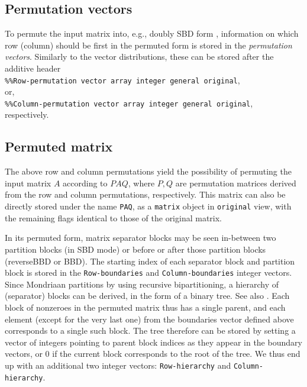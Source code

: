 \documentclass[final]{amsart}
\begin{document}
\subsection{Permutation vectors}

To permute the input matrix into, e.g., doubly SBD form \cite{co1,co2},
information on which row (column) should be first in the permuted form is stored in the \emph{permutation vectors}.
Similarly to the vector distributions,
these can be stored after the additive header\\
\verb|%%Row-permutation vector array integer general original|,\\
or,\\
\verb|%%Column-permutation vector array integer general original|,\\
respectively.


\subsection{Permuted matrix}
The above row and column permutations yield the possibility of permuting the
input matrix $A$ according to $PAQ$, where $P,Q$ are permutation matrices
derived from the row and column permutations, respectively.
This matrix can also be directly stored under the name \verb|PAQ|,
as a \verb|matrix| object in \verb|original| view, with the remaining flags
identical to those of the original matrix.

In its permuted form,
matrix separator blocks may be seen in-between two partition blocks 
(in SBD mode)
or before or after those partition blocks
(reverseBBD or BBD).
The starting index of each separator block and partition block is stored in the
\verb|Row-boundaries| and \verb|Column-boundaries| integer vectors.
Since Mondriaan partitions by using recursive bipartitioning,
a hierarchy of (separator) blocks can be derived,
in the form of a binary tree. See also \cite{co2}.
Each block of nonzeroes in the permuted matrix
thus has a single parent, and each element (except for the very last one)
from the boundaries vector defined above corresponds to a single such block.
The tree therefore can be stored by setting a vector of integers pointing to
parent block indices as they appear in the boundary vectors, or $0$ if the
current block corresponds to the root of the tree. We thus end up with an
additional two integer vectors: \verb|Row-hierarchy| and
\verb|Column-hierarchy|.
\end{document}
